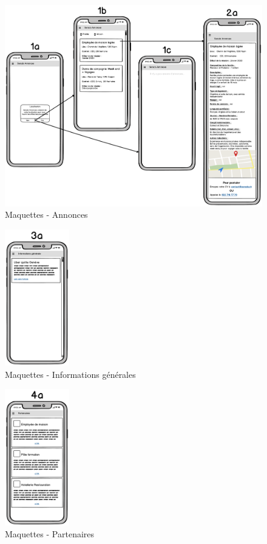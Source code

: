 \documentclass[french]{report}
\begin{document}
\begin{figure}[H]
    \centering
    \includegraphics[width=\textwidth]{../mocks/1-2.pdf}
    \caption{Maquettes - Annonces}
    \label{fig:mockup_ads}
\end{figure}

\begin{figure}[H]
    \centering
    \includegraphics[width=0.25\textwidth]{../mocks/3.pdf}
    \caption{Maquettes - Informations générales}
    \label{fig:mockups_infos}
\end{figure}

\begin{figure}[H]
    \centering
    \includegraphics[width=0.25\textwidth]{../mocks/4.pdf}
    \caption{Maquettes - Partenaires}
    \label{fig:mockups_partners}
\end{figure}
\end{document}
